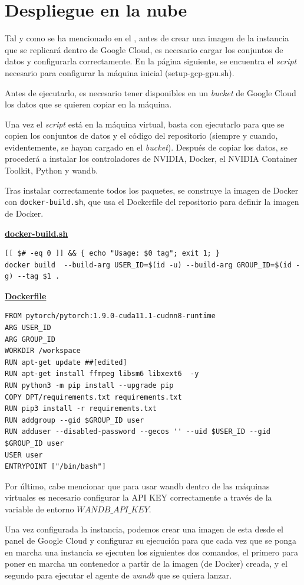\section{Despliegue en la nube}

Tal y como se ha mencionado en el , antes de crear una imagen de la instancia que se replicará dentro de Google Cloud, es necesario cargar los conjuntos de datos y configurarla correctamente. En la página siguiente, se encuentra el \textit{script} necesario para configurar la máquina inicial (setup-gcp-gpu.sh).

Antes de ejecutarlo, es necesario tener disponibles en un \textit{bucket} de Google Cloud los datos que se quieren copiar en la máquina.

Una vez el \textit{script} está en la máquina virtual, basta con ejecutarlo para que se copien los conjuntos de datos y el código del repositorio (siempre y cuando, evidentemente, se hayan cargado en el \textit{bucket}). Después de copiar los datos, se procederá a instalar los controladores de NVIDIA, Docker, el NVIDIA Container Toolkit, Python y wandb. 

Tras instalar correctamente todos los paquetes, se construye la imagen de Docker con \texttt{docker-build.sh}, que usa el Dockerfile del repositorio para definir la imagen de Docker.

\underline{\textbf{docker-build.sh}}
\begin{verbatim}
[[ $# -eq 0 ]] && { echo "Usage: $0 tag"; exit 1; }
docker build  --build-arg USER_ID=$(id -u) --build-arg GROUP_ID=$(id -g) --tag $1 .
\end{verbatim}

\underline{\textbf{Dockerfile}}
\begin{verbatim}
FROM pytorch/pytorch:1.9.0-cuda11.1-cudnn8-runtime
ARG USER_ID
ARG GROUP_ID
WORKDIR /workspace
RUN apt-get update ##[edited]
RUN apt-get install ffmpeg libsm6 libxext6  -y
RUN python3 -m pip install --upgrade pip
COPY DPT/requirements.txt requirements.txt
RUN pip3 install -r requirements.txt
RUN addgroup --gid $GROUP_ID user
RUN adduser --disabled-password --gecos '' --uid $USER_ID --gid $GROUP_ID user
USER user
ENTRYPOINT ["/bin/bash"]
\end{verbatim}

Por último, cabe mencionar que para usar wandb dentro de las máquinas virtuales es necesario configurar la API KEY correctamente a través de la variable de entorno $WANDB{\_}API{\_}KEY$.

Una vez configurada la instancia, podemos crear una imagen de esta desde el panel de Google Cloud y configurar su ejecución para que cada vez que se ponga en marcha una instancia se ejecuten los siguientes dos comandos, el primero para poner en marcha un contenedor a partir de la imagen (de Docker) creada, y el segundo para ejecutar el agente de \textit{wandb} que se quiera lanzar.

